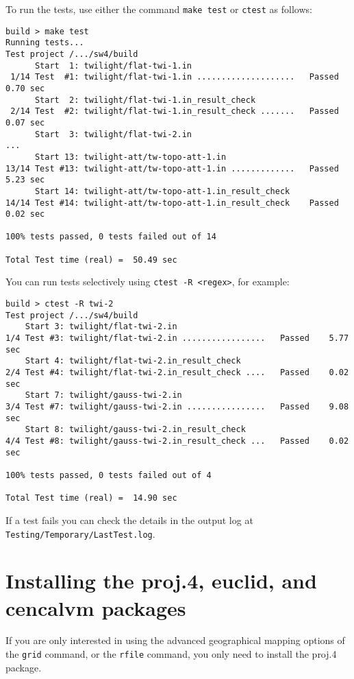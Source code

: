 \documentclass[11pt]{article}
\begin{document}
To run the tests, use either the command \texttt{make test} or \texttt{ctest} as follows:
%
\begin{verbatim}
build > make test
Running tests...
Test project /.../sw4/build
      Start  1: twilight/flat-twi-1.in
 1/14 Test  #1: twilight/flat-twi-1.in ....................   Passed    0.70 sec
      Start  2: twilight/flat-twi-1.in_result_check
 2/14 Test  #2: twilight/flat-twi-1.in_result_check .......   Passed    0.07 sec
      Start  3: twilight/flat-twi-2.in
...
      Start 13: twilight-att/tw-topo-att-1.in
13/14 Test #13: twilight-att/tw-topo-att-1.in .............   Passed    5.23 sec
      Start 14: twilight-att/tw-topo-att-1.in_result_check
14/14 Test #14: twilight-att/tw-topo-att-1.in_result_check    Passed    0.02 sec

100% tests passed, 0 tests failed out of 14

Total Test time (real) =  50.49 sec
\end{verbatim}

You can run tests selectively using \texttt{ctest -R \textless regex\textgreater}, for example:
%
\begin{verbatim}
build > ctest -R twi-2
Test project /.../sw4/build
    Start 3: twilight/flat-twi-2.in
1/4 Test #3: twilight/flat-twi-2.in .................   Passed    5.77 sec
    Start 4: twilight/flat-twi-2.in_result_check
2/4 Test #4: twilight/flat-twi-2.in_result_check ....   Passed    0.02 sec
    Start 7: twilight/gauss-twi-2.in
3/4 Test #7: twilight/gauss-twi-2.in ................   Passed    9.08 sec
    Start 8: twilight/gauss-twi-2.in_result_check
4/4 Test #8: twilight/gauss-twi-2.in_result_check ...   Passed    0.02 sec

100% tests passed, 0 tests failed out of 4

Total Test time (real) =  14.90 sec
\end{verbatim}

If a test fails you can check the details in the output log at
\texttt{Testing/Temporary/LastTest.log}.

\section{Installing the proj.4, euclid, and cencalvm packages}\label{sec:cencalvm-install}
 

If you are only interested in using the advanced geographical mapping options of the {\tt grid} command,
or the {\tt rfile} command, you only need to install the proj.4 package.
\end{document}
